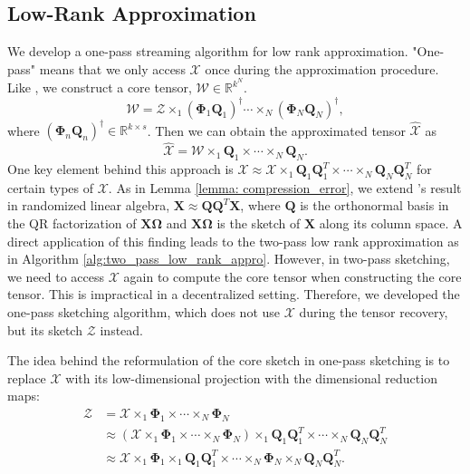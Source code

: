 \subsection{Low-Rank Approximation} 
We develop a one-pass streaming algorithm for low rank approximation. "One-pass" means that we only access $\mathscr{X}$ once during the approximation procedure. Like \cite{tropp2016randomized}, we construct a core tensor, $\mathscr{W} \in \mathbb{R}^{k^N}$. 
\begin{equation}
\mathscr{W} =
\mathscr{Z}\times_1 (\mathbf{\Phi}_1\mathbf{Q}_1)^\dag \cdots \times_N (\mathbf{\Phi}_N\mathbf{Q}_N)^\dag, 
\end{equation}
where $(\mathbf{\Phi}_n \mathbf{Q}_n)^\dag \in \mathbb{R}^{k \times s} $. Then we can obtain the approximated tensor $\hat{\mathscr{X}}$ as
\begin{equation}
\hat{\mathscr{X}} = \mathscr{W} \times_1 \mathbf{Q}_1 \times \cdots \times_N \mathbf{Q}_N.
\end{equation}
One key element behind this approach is $\mathscr{X} \approx \mathscr{X} \times_1 \mathbf{Q}_1\mathbf{Q}_1^T \times \cdots \times_N \mathbf{Q}_N\mathbf{Q}_N^T$ for certain types of $\mathscr{X}$. As in Lemma \ref{lemma: compression_error}, we extend \cite{halko2011finding}'s result in randomized linear algebra, $\mathbf{X} \approx \mathbf{Q}\mathbf{Q}^T\mathbf{X}$, where $\mathbf{Q}$ is the orthonormal basis in the QR factorization of $\mathbf{X}\mathbf{\Omega}$ and $\mathbf{X}\mathbf{\Omega}$ is the sketch of $\mathbf{X}$ along its column space. A direct application of this finding leads to the two-pass low rank approximation as in Algorithm \ref{alg:two_pass_low_rank_appro}. However, in two-pass sketching, we need to access $\mathscr{X}$ again to compute the core tensor when constructing the core tensor. This is impractical in a decentralized setting. Therefore, we developed the one-pass sketching algorithm, which does not use $\mathscr{X}$ during the tensor recovery, but its sketch $\mathscr{Z}$ instead. \par 
The idea behind the reformulation of the core sketch in one-pass sketching is to replace $\mathscr{X}$ with its low-dimensional projection with the dimensional reduction maps:
\begin{equation}
\begin{aligned}
\mathscr{Z} &= \mathscr{X}\times_1 \mathbf{\Phi}_1 \times \cdots \times_N \mathbf{\Phi}_N  \\ 
& \approx (\mathscr{X}\times_1 \mathbf{\Phi}_1 \times \cdots \times_N \mathbf{\Phi}_N) \times_1 \mathbf{Q}_1\mathbf{Q}_1^T \times \cdots \times_N \mathbf{Q}_N\mathbf{Q}_N^T\\
&\approx \mathscr{X}\times_1 \mathbf{\Phi}_1 \times_1\mathbf{Q}_1\mathbf{Q}_1^T \times \cdots \times_N \mathbf{\Phi}_N \times_N \mathbf{Q}_N\mathbf{Q}_N^T.
\end{aligned}
\end{equation}
